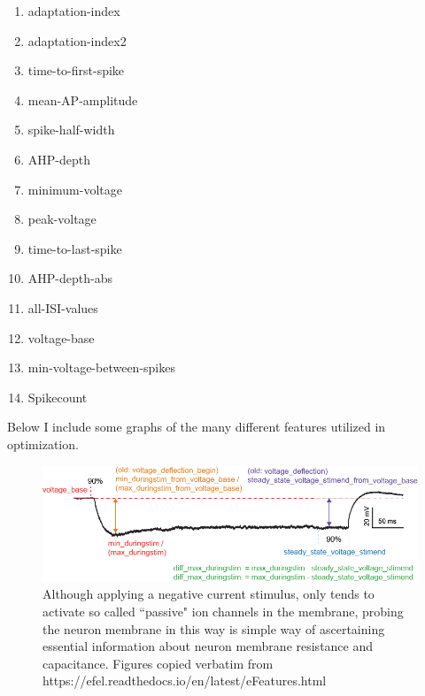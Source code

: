 \begin{enumerate}
\item adaptation-index
\item adaptation-index2
\item time-to-first-spike
\item mean-AP-amplitude
\item spike-half-width
\item AHP-depth
\item minimum-voltage
\item peak-voltage
\item time-to-last-spike
\item AHP-depth-abs
\item all-ISI-values
\item voltage-base
\item min-voltage-between-spikes
\item Spikecount
\end{enumerate}


Below I include some graphs of the many different features utilized in optimization.

\begin{figure}
    \centering
    \includegraphics{figures/voltage_features.png}
    \caption[passive membrane properties probed with a negative amplitude current stimulus]{Although applying a negative current stimulus, only tends to activate so called ``passive" ion channels in the membrane, probing the neuron membrane in this way is simple way of ascertaining essential information about neuron membrane resistance and capacitance.  Figures  copied verbatim from https://efel.readthedocs.io/en/latest/eFeatures.html}
    \label{fig:voltage_figures}
\end{figure}





